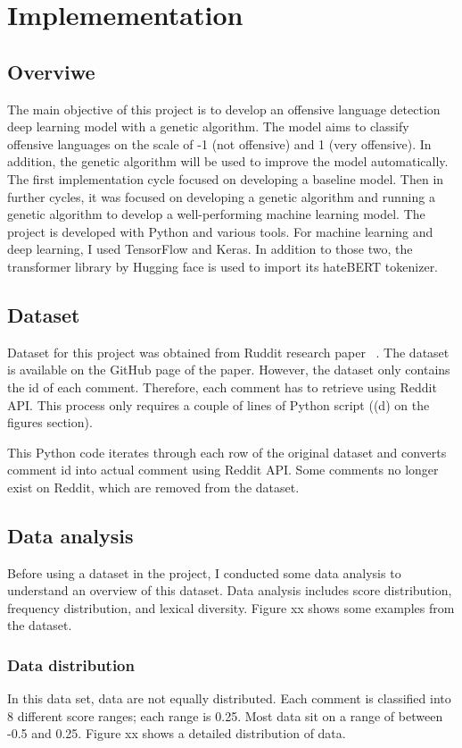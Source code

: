 \documentclass[11pt, natbib=false]{article}
\begin{document}
\section{Implemementation}
\subsection{Overviwe}
The main objective of this project is to develop an offensive language detection deep learning model with a genetic algorithm.
The model aims to classify offensive languages on the scale of -1 (not offensive) and 1 (very offensive).
In addition, the genetic algorithm will be used to improve the model automatically.
The first implementation cycle focused on developing a baseline model.
Then in further cycles, it was focused on developing a genetic algorithm and running a genetic algorithm to develop a well-performing machine learning model.
The project is developed with Python and various tools.
For machine learning and deep learning, I used TensorFlow and Keras.
In addition to those two, the transformer library by Hugging face is used to import its hateBERT tokenizer.

\subsection{Dataset}
Dataset for this project was obtained from Ruddit research paper ~\cite{hada2021ruddit}.
The dataset is available on the GitHub page of the paper.
However, the dataset only contains the id of each comment.
Therefore, each comment has to retrieve using Reddit API.
This process only requires a couple of lines of Python script ((d) on the figures section).

This Python code iterates through each row of the original dataset and converts comment id into actual comment using Reddit API.
Some comments no longer exist on Reddit, which are removed from the dataset.

\subsection{Data analysis}
Before using a dataset in the project, I conducted some data analysis to understand an overview of this dataset.
Data analysis includes score distribution, frequency distribution, and lexical diversity.
Figure xx shows some examples from the dataset.

\subsubsection{Data distribution}
In this data set, data are not equally distributed.
Each comment is classified into 8 different score ranges; each range is 0.25. Most data sit on a range of between -0.5 and 0.25.
Figure xx shows a detailed distribution of data.
\end{document}

